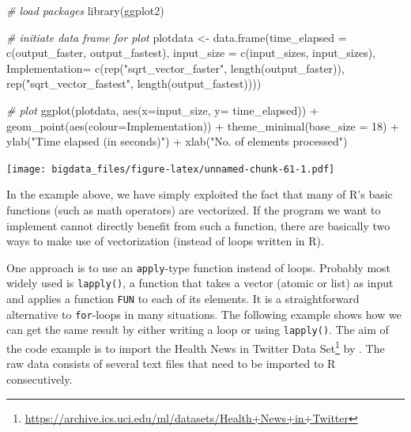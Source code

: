 \documentclass[
  12pt,
]{style/krantz}
\newenvironment{Shaded}{\begin{snugshade}}{\end{snugshade}}
\newcommand{\AttributeTok}[1]{\textcolor[rgb]{0.77,0.63,0.00}{#1}}
\newcommand{\CommentTok}[1]{\textcolor[rgb]{0.56,0.35,0.01}{\textit{#1}}}
\newcommand{\DecValTok}[1]{\textcolor[rgb]{0.00,0.00,0.81}{#1}}
\newcommand{\FunctionTok}[1]{\textcolor[rgb]{0.00,0.00,0.00}{#1}}
\newcommand{\NormalTok}[1]{#1}
\newcommand{\OtherTok}[1]{\textcolor[rgb]{0.56,0.35,0.01}{#1}}
\newcommand{\SpecialCharTok}[1]{\textcolor[rgb]{0.00,0.00,0.00}{#1}}
\newcommand{\StringTok}[1]{\textcolor[rgb]{0.31,0.60,0.02}{#1}}
\renewcommand{\href}[2]{#2\footnote{\url{#1}}}
\begin{document}
\begin{Shaded}
\begin{Highlighting}[]
\CommentTok{\# load packages}
\FunctionTok{library}\NormalTok{(ggplot2)}

\CommentTok{\# initiate data frame for plot}
\NormalTok{plotdata }\OtherTok{\textless{}{-}} \FunctionTok{data.frame}\NormalTok{(}\AttributeTok{time\_elapsed =} \FunctionTok{c}\NormalTok{(output\_faster, output\_fastest),}
                       \AttributeTok{input\_size =} \FunctionTok{c}\NormalTok{(input\_sizes, input\_sizes),}
                       \AttributeTok{Implementation=} \FunctionTok{c}\NormalTok{(}\FunctionTok{rep}\NormalTok{(}\StringTok{"sqrt\_vector\_faster"}\NormalTok{, }\FunctionTok{length}\NormalTok{(output\_faster)),}
                            \FunctionTok{rep}\NormalTok{(}\StringTok{"sqrt\_vector\_fastest"}\NormalTok{, }\FunctionTok{length}\NormalTok{(output\_fastest))))}

\CommentTok{\# plot}
\FunctionTok{ggplot}\NormalTok{(plotdata, }\FunctionTok{aes}\NormalTok{(}\AttributeTok{x=}\NormalTok{input\_size, }\AttributeTok{y=}\NormalTok{ time\_elapsed)) }\SpecialCharTok{+}
     \FunctionTok{geom\_point}\NormalTok{(}\FunctionTok{aes}\NormalTok{(}\AttributeTok{colour=}\NormalTok{Implementation)) }\SpecialCharTok{+}
     \FunctionTok{theme\_minimal}\NormalTok{(}\AttributeTok{base\_size =} \DecValTok{18}\NormalTok{) }\SpecialCharTok{+}
     \FunctionTok{ylab}\NormalTok{(}\StringTok{"Time elapsed (in seconds)"}\NormalTok{) }\SpecialCharTok{+}
     \FunctionTok{xlab}\NormalTok{(}\StringTok{"No. of elements processed"}\NormalTok{)}
\end{Highlighting}
\end{Shaded}

\texttt{[image: bigdata\_files/figure-latex/unnamed-chunk-61-1.pdf]}

In the example above, we have simply exploited the fact that many of R's basic functions (such as math operators) are vectorized. If the program we want to implement cannot directly benefit from such a function, there are basically two ways to make use of vectorization (instead of loops written in R).

One approach is to use an \texttt{apply}-type function instead of loops. Probably most widely used is \texttt{lapply()}, a function that takes a vector (atomic or list) as input and applies a function \texttt{FUN} to each of its elements. It is a straightforward alternative to \texttt{for}-loops in many situations. The following example shows how we can get the same result by either writing a loop or using \texttt{lapply()}. The aim of the code example is to import the \href{https://archive.ics.uci.edu/ml/datasets/Health+News+in+Twitter}{Health News in Twitter Data Set} by \citet{karami_etal2017}. The raw data consists of several text files that need to be imported to R consecutively.
\end{document}
